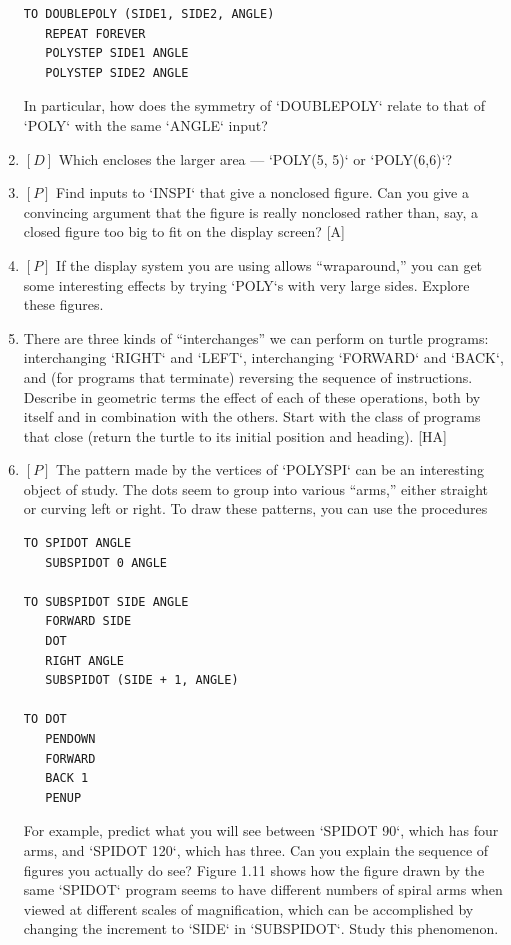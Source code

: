 \documentclass{book}
\begin{document}
\begin{enumerate}
\begin{verbatim}
TO DOUBLEPOLY (SIDE1, SIDE2, ANGLE)
   REPEAT FOREVER
   POLYSTEP SIDE1 ANGLE
   POLYSTEP SIDE2 ANGLE
\end{verbatim}
In particular, how does the symmetry of \textsc{`DOUBLEPOLY`} relate to that of
\textsc{`POLY`} with the same \textsc{`ANGLE`} input?  
\item $[D]$ Which encloses the larger area --- \textsc{`POLY(5, 5)`} or \textsc{`POLY(6,6)`}?
\item $[P]$ Find inputs to \textsc{`INSPI`} that give a nonclosed figure. Can you give
a convincing argument that the figure is really nonclosed rather than,
say, a closed figure too big to fit on the display screen? [A]
\item $[P]$ If the display system you are using allows ``wraparound,'' you
can get some interesting effects by trying \textsc{`POLY`}s with very large sides.
Explore these figures.  
\item There are three kinds of ``interchanges'' we can perform on turtle
programs: interchanging \textsc{`RIGHT`} and \textsc{`LEFT`}, interchanging \textsc{`FORWARD`} and
\textsc{`BACK`}, and (for programs that terminate) reversing the sequence of instructions. Describe in geometric terms the effect of each of these operations, both by itself and in combination with the others. Start with the
class of programs that close (return the turtle to its initial position and
heading). [HA]
\item $[P]$ The pattern made by the vertices of \textsc{`POLYSPI`} can be an interesting object of study. The dots seem to group into various ``arms,'' either
straight or curving left or right. To draw these patterns, you can use
the procedures

\begin{verbatim}
TO SPIDOT ANGLE
   SUBSPIDOT 0 ANGLE

TO SUBSPIDOT SIDE ANGLE
   FORWARD SIDE
   DOT
   RIGHT ANGLE
   SUBSPIDOT (SIDE + 1, ANGLE)

TO DOT
   PENDOWN
   FORWARD
   BACK 1
   PENUP
\end{verbatim}
For example, predict what you will see between \textsc{`SPIDOT 90`}, which has
four arms, and \textsc{`SPIDOT 120`}, which has three. Can you explain the
sequence of figures you actually do see? Figure 1.11 shows how the figure
drawn by the same \textsc{`SPIDOT`} program seems to have different numbers
of spiral arms when viewed at different scales of magnification, which
can be accomplished by changing the increment to \textsc{`SIDE`} in \textsc{`SUBSPIDOT`}.
Study this phenomenon.  


\end{enumerate}
\end{document}
